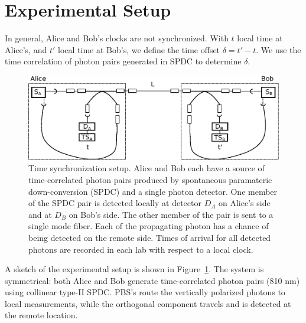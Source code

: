 \documentclass[aps,pra,onecolumn, superscriptaddress]{revtex4}
\begin{document}
\section{Experimental Setup}
      
In general, Alice and Bob's clocks are not synchronized.
With $t$ local time at Alice's, and $ t'$ local time at Bob's,
we define the time offset $\delta = t' - t$.
We use the time correlation of photon pairs generated in SPDC to determine $\delta$.

\begin{figure}[htbp]
  \centering
  \includegraphics[width=16cm]{figures/setup_simplified.eps}
  \caption{\label{fig:setup}
  Time synchronization setup. Alice and Bob each have a source of time-correlated photon pairs produced by spontaneous paramateric down-conversion (SPDC) and a single photon detector. One member of the SPDC pair is detected locally at detector $D_A$ on Alice's side and at $D_B$ on Bob's side. The other member of the pair is sent to a single mode fiber. Each of the propagating photon has a chance of being detected on the remote side. Times of arrival for all detected photons are recorded in each lab with respect to a local clock. 
  }
\end{figure}

A sketch of the experimental setup is shown in Figure~\ref{fig:setup}.
The system is symmetrical: both Alice and Bob generate time-correlated photon pairs (810 nm) using collinear type-II SPDC.
PBS's route the vertically polarized photons to local measurements, while the orthogonal component travels and is detected at the remote location.
\end{document}
